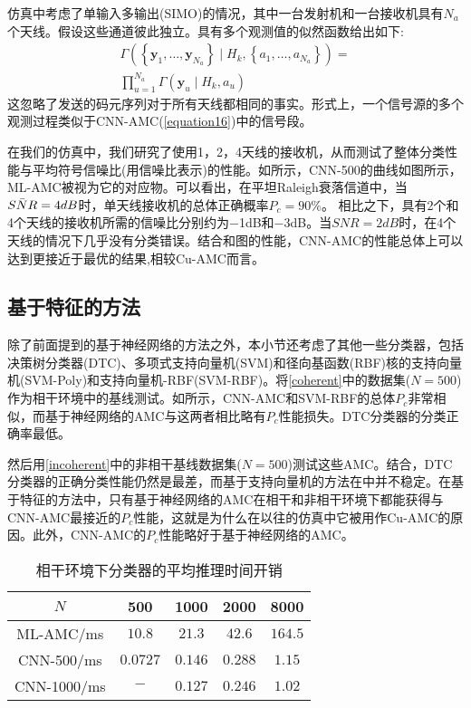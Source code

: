 \documentclass[final]{cvpr}
\begin{document}
仿真中考虑了单输入多输出(SIMO)的情况，其中一台发射机和一台接收机具有$N_a$个天线。假设这些通道彼此独立。具有多个观测值的似然函数给出如下:
\begin{equation}
\begin{array}{cc}
\Gamma\left(\left\{\mathbf{y}_{1}, \ldots, \mathbf{y}_{N_{a}}\right\} \mid H_{k},\left\{a_{1}, \ldots, a_{N_{a}}\right\}\right)=\\ \prod_{u=1}^{N_{a}} \Gamma\left(\mathbf{y}_{u} \mid H_{k}, a_{u}\right)
\end{array}
\end{equation}
这忽略了发送的码元序列对于所有天线都相同的事实。形式上，一个信号源的多个观测过程类似于CNN-AMC(\ref{equation16})中的信号段。

在我们的仿真中，我们研究了使用1，2，4天线的接收机，从而测试了整体分类性能与平均符号信噪比(用信噪比表示)的性能。如所示，CNN-500的曲线如图所示，ML-AMC被视为它的对应物。可以看出，在平坦Raleigh衰落信道中，当$\Bar{SNR}=4dB$时，单天线接收机的总体正确概率$P_c=90\%$。
相比之下，具有2个和4个天线的接收机所需的信噪比分别约为−1dB和−3dB。当$SNR=2dB$时，在4个天线的情况下几乎没有分类错误。结合和图的性能，CNN-AMC的性能总体上可以达到更接近于最优的结果,相较Cu-AMC而言。

\subsection{基于特征的方法}\label{FeatureBased}
除了前面提到的基于神经网络的方法之外，本小节还考虑了其他一些分类器，包括决策树分类器(DTC)、多项式支持向量机(SVM)和径向基函数(RBF)核的支持向量机(SVM-Poly)和支持向量机-RBF(SVM-RBF)。将\ref{coherent}中的数据集($N=500$)作为相干环境中的基线测试。如所示，CNN-AMC和SVM-RBF的总体$P_c$非常相似，而基于神经网络的AMC与这两者相比略有$P_c$性能损失。DTC分类器的分类正确率最低。

然后用\ref{incoherent}中的非相干基线数据集($N=500$)测试这些AMC。结合，DTC分类器的正确分类性能仍然是最差，而基于支持向量机的方法在中并不稳定。在基于特征的方法中，只有基于神经网络的AMC在相干和非相干环境下都能获得与CNN-AMC最接近的$P_c$性能，这就是为什么在以往的仿真中它被用作Cu-AMC的原因。此外，CNN-AMC的$P_c$性能略好于基于神经网络的AMC。


\begin{table}[htbp]
\centering
\caption{相干环境下分类器的平均推理时间开销}
\begin{tabular}{c|c|c|c|c}
\hline$N$ & 500 & 1000 & 2000 & 8000 \\
\hline ML-AMC/ms & $10.8$ & $21.3$ & $42.6$ & $164.5$ \\
CNN-500/ms & $0.0727$ & $0.146$ & $0.288$ & $1.15$ \\
CNN-1000/ms & $-$ & $0.127$ & $0.246$ & $1.02$ \\
\hline
\end{tabular}\label{tab:3}
\end{table}
\end{document}
